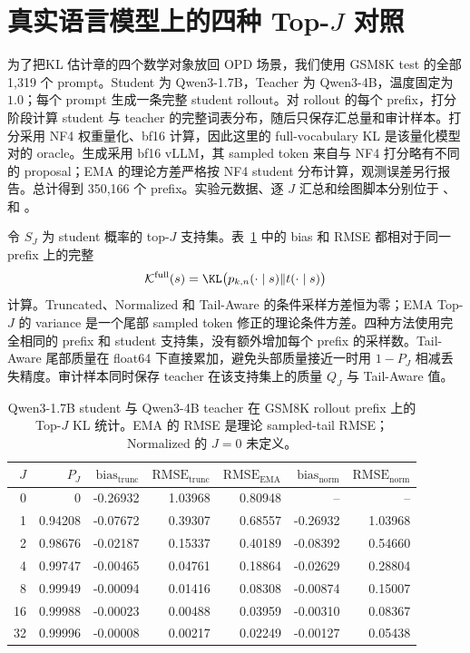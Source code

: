 \section{真实语言模型上的四种 \texorpdfstring{Top-$J$}{Top-J} 对照}

为了把KL 估计章的四个数学对象放回 OPD 场景，我们使用 GSM8K test 的全部 1,319 个 prompt。Student 为 Qwen3-1.7B，Teacher 为 Qwen3-4B，温度固定为 $1.0$；每个 prompt 生成一条完整 student rollout。对 rollout 的每个 prefix，打分阶段计算 student 与 teacher 的完整词表分布，随后只保存汇总量和审计样本。打分采用 NF4 权重量化、bf16 计算，因此这里的 full-vocabulary KL 是该量化模型对的 oracle。生成采用 bf16 vLLM，其 sampled token 来自与 NF4 打分略有不同的 proposal；EMA 的理论方差严格按 NF4 student 分布计算，观测误差另行报告。总计得到 350,166 个 prefix。实验元数据、逐 $J$ 汇总和绘图脚本分别位于 、  和 。

令 $S_J$ 为 student 概率的 top-$J$ 支持集。表~\ref{tab:qwen-topk-four} 中的 bias 和 RMSE 都相对于同一 prefix 上的完整
\begin{equation}
 \mathcal K^{\mathrm{full}}(s)=\KL\bigl(p_{k,n}(\cdot\mid s)\Vert t(\cdot\mid s)\bigr)
\end{equation}
计算。Truncated、Normalized 和 Tail-Aware 的条件采样方差恒为零；EMA Top-$J$ 的 variance 是一个尾部 sampled token 修正的理论条件方差。四种方法使用完全相同的 prefix 和 student 支持集，没有额外增加每个 prefix 的采样数。Tail-Aware 尾部质量在 float64 下直接累加，避免头部质量接近一时用 $1-P_J$ 相减丢失精度。审计样本同时保存 teacher 在该支持集上的质量 $Q_J$ 与 Tail-Aware 值。

\begin{table}[ht]
\centering
\small
\caption{Qwen3-1.7B student 与 Qwen3-4B teacher 在 GSM8K rollout prefix 上的 Top-$J$ KL 统计。EMA 的 RMSE 是理论 sampled-tail RMSE；Normalized 的 $J=0$ 未定义。}
\label{tab:qwen-topk-four}
\begin{tabular}{rrrrrrr}
\toprule
$J$ & $P_J$ & $\mathrm{bias}_{\mathrm{trunc}}$ & $\mathrm{RMSE}_{\mathrm{trunc}}$ & $\mathrm{RMSE}_{\mathrm{EMA}}$ & $\mathrm{bias}_{\mathrm{norm}}$ & $\mathrm{RMSE}_{\mathrm{norm}}$\\
\midrule
0  & 0       & -0.26932 & 1.03968 & 0.80948 & --       & --\\
1  & 0.94208 & -0.07672 & 0.39307 & 0.68557 & -0.26932 & 1.03968\\
2  & 0.98676 & -0.02187 & 0.15337 & 0.40189 & -0.08392 & 0.54660\\
4  & 0.99747 & -0.00465 & 0.04761 & 0.18864 & -0.02629 & 0.28804\\
8  & 0.99949 & -0.00094 & 0.01416 & 0.08308 & -0.00874 & 0.15007\\
16 & 0.99988 & -0.00023 & 0.00488 & 0.03959 & -0.00310 & 0.08367\\
32 & 0.99996 & -0.00008 & 0.00217 & 0.02249 & -0.00127 & 0.05438\\
\bottomrule
\end{tabular}
\end{table}

